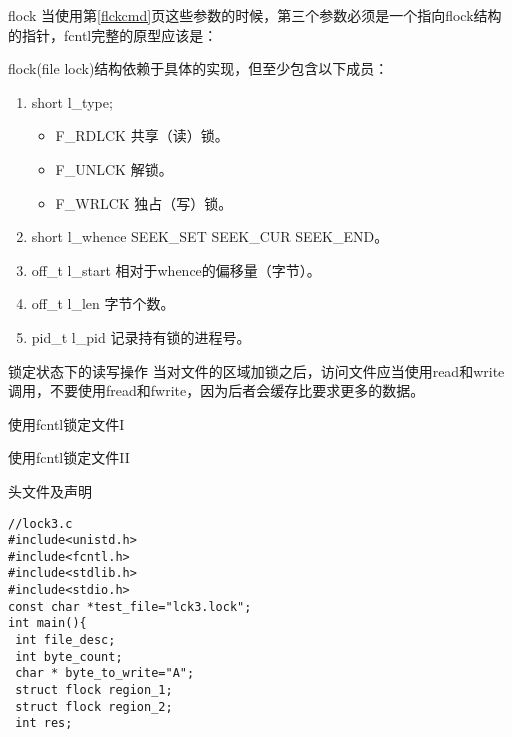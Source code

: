 \documentclass{beamer}
\begin{document}
\begin{frame}{flock}
当使用第\ref{flckcmd}页这些参数的时候，第三个参数必须是一个指向flock结构的指针，fcntl完整的原型应该是：


flock(file lock)结构依赖于具体的实现，但至少包含以下成员：
\begin{enumerate}
\item
short l\_type;
\begin{itemize}
\item
F\_RDLCK  共享（读）锁。
\item
F\_UNLCK 解锁。
\item
F\_WRLCK 独占（写）锁。
\end{itemize}
\item
short l\_whence  SEEK\_SET SEEK\_CUR SEEK\_END。
\item
off\_t l\_start 相对于whence的偏移量（字节）。
\item
off\_t l\_len 字节个数。
\item
pid\_t l\_pid 记录持有锁的进程号。
\end{enumerate}
\end{frame}
\begin{frame}{锁定状态下的读写操作}
当对文件的区域加锁之后，访问文件应当使用read和write调用，不要使用fread和fwrite，因为后者会缓存比要求更多的数据。

\end{frame}
\begin{frame}{使用fcntl锁定文件I}
\end{frame}
\begin{frame}[fragile]{使用fcntl锁定文件II}
\begin{block}{头文件及声明}
\begin{lstlisting}
//lock3.c
#include<unistd.h>
#include<fcntl.h>
#include<stdlib.h>
#include<stdio.h>
const char *test_file="lck3.lock";
int main(){
 int file_desc;
 int byte_count;
 char * byte_to_write="A";
 struct flock region_1;
 struct flock region_2;
 int res;
\end{lstlisting}
\end{block}
\end{frame}
\end{document}
